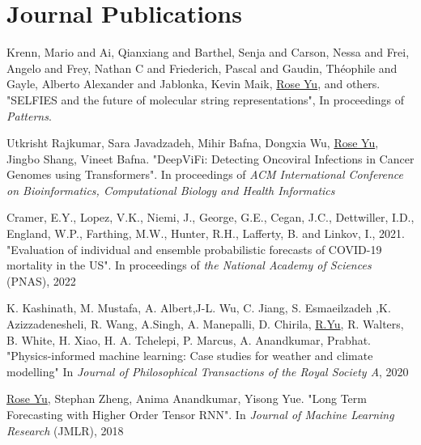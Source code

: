 \documentclass[margin,line]{res}
\begin{document}
\begin{resume}
\begin{enumerate}[label={[C\arabic*]}]
\end{enumerate}

 
\section{\sc Journal Publications}
\begin{enumerate}[label={[J\arabic*]}]
\item Krenn, Mario and Ai, Qianxiang and Barthel, Senja and Carson, Nessa and Frei, Angelo and Frey, Nathan C and Friederich, Pascal and Gaudin, Th{\'e}ophile and Gayle, Alberto Alexander and Jablonka, Kevin Maik, \underline{Rose Yu}, and others. "SELFIES and the future of molecular string representations", In proceedings of \textit{Patterns}.

\item Utkrisht Rajkumar, Sara Javadzadeh, Mihir Bafna, Dongxia Wu, \underline{Rose Yu}, Jingbo Shang, Vineet Bafna. "DeepViFi: Detecting Oncoviral Infections in Cancer Genomes using Transformers". In proceedings of \textit{ACM International Conference on Bioinformatics, Computational Biology and Health Informatics}


\item Cramer, E.Y., Lopez, V.K., Niemi, J., George, G.E., Cegan, J.C., Dettwiller, I.D., England, W.P., Farthing, M.W., Hunter, R.H., Lafferty, B. and Linkov, I., 2021. "Evaluation of individual and ensemble probabilistic forecasts of COVID-19 mortality in the US". In proceedings of  \textit{the National Academy of Sciences} (PNAS), 2022


\item K. Kashinath, M. Mustafa, A. Albert,J-L. Wu, C. Jiang, S. Esmaeilzadeh ,K. Azizzadenesheli, R. Wang, A.Singh, A. Manepalli, D. Chirila, \underline{R.Yu}, R. Walters, B. White, H. Xiao, H. A. Tchelepi, P. Marcus, A. Anandkumar,  Prabhat. "Physics-informed machine learning: Case studies for weather and climate modelling" In \textit{Journal of Philosophical Transactions of the Royal Society  A}, 2020

\item \underline{Rose Yu}, Stephan Zheng, Anima Anandkumar, Yisong Yue. "Long Term Forecasting with Higher Order Tensor RNN". In  \textit{ Journal of Machine Learning Research} (JMLR), 2018




\end{enumerate}
\end{resume}
\end{document}
